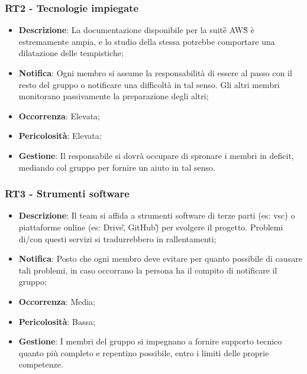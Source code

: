 	\subsubsection*{RT2 - Tecnologie impiegate}
	\begin{itemize}
		\item \textbf{Descrizione}: La documentazione disponibile per la suite\G{} AWS\G{} è estremamente ampia, e lo studio della stessa potrebbe comportare una dilatazione delle tempistiche;
		\item \textbf{Notifica}: Ogni membro si assume la responsabilità di essere al passo con il resto del gruppo o notificare una difficoltà in tal senso. Gli altri membri monitorano passivamente la preparazione degli altri;
		\item \textbf{Occorrenza}: Elevata;
		\item \textbf{Pericolosità}: Elevata;
		\item \textbf{Gestione}: Il responsabile si dovrà occupare di spronare i membri in deficit, mediando col gruppo per fornire un aiuto in tal senso.
	\end{itemize}

   \subsubsection*{RT3 - Strumenti software}
   \begin{itemize}
   	\item \textbf{Descrizione}: Il team si affida a strumenti software di terze parti (es: vsc) o piattaforme online (es: Drive\G, GitHub\G) per svolgere il progetto. Problemi di/con questi servizi si tradurrebbero in rallentamenti;
   	\item \textbf{Notifica}: Posto che ogni membro deve evitare per quanto possibile di causare tali problemi, in caso occorrano la persona ha il compito di notificare il gruppo;
   	\item \textbf{Occorrenza}: Media;
   	\item \textbf{Pericolosità}: Bassa;
   	\item \textbf{Gestione}: I membri del gruppo si impegnano a fornire supporto tecnico quanto più completo e repentino possibile, entro i limiti delle proprie competenze.
   \end{itemize}

